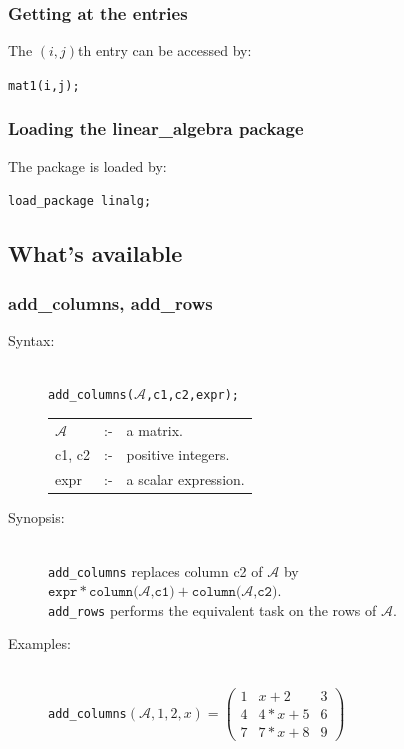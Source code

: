 {\subsubsection*{Getting at the entries}

The $(i,j)$th entry can be accessed by:

\texttt{mat1(i,j);}

\subsubsection*{Loading the linear\_algebra package}

The package is loaded by:

\texttt{load\_package linalg;}


\subsection{What's available}

\label{linalg:subsec3}

\subsubsection{add\_columns, add\_rows}
\label{linalg:add_columns}
\hypertarget{operator:ADD_COLUMNS}{}

\begin{description}
\item[Syntax:]\mbox{}\\
{\tt add\_columns($\mathcal{A}$,c1,c2,expr);}

\begin{tabular}{l l l}
$\mathcal{A}$ & :- & a matrix. \\
c1, c2     & :- & positive integers. \\
expr       & :- & a scalar expression.
\end{tabular}

\item[Synopsis:]\mbox{}\\
\texttt{add\_columns} replaces column c2 of $\mathcal{A}$ by\\
$\texttt{expr} * \texttt{column($\mathcal{A}$,c1)} + \texttt{column($\mathcal{A}$,c2)}$.\\
\texttt{add\_rows} performs the equivalent task on the rows of $\mathcal{A}$.

\item[Examples:]\mbox{}\\
  \texttt{add\_columns}\((\mathcal{A},1,2,x)  =
  \begin{pmatrix} 1 & x+2 & 3 \\ 4 & 4*x+5 & 6 \\ 7 & 7*x+8 & 9 \end{pmatrix}\)


\end{description}}
